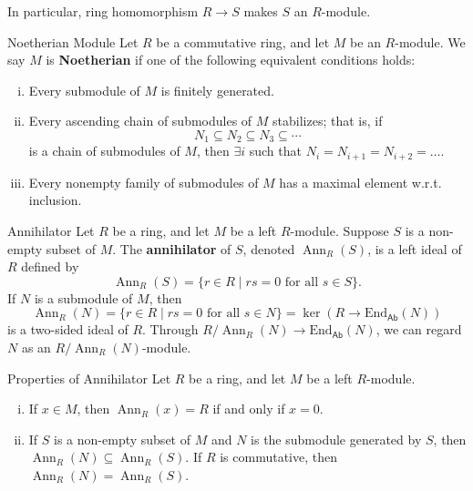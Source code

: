 In particular, ring homomorphism $R\to S$ makes $S$ an $R$-module.

\begin{definition}{Noetherian Module}{}
Let $R$ be a commutative ring, and let $M$ be an $R$-module. We say $M$ is \textbf{Noetherian} if one of the following equivalent conditions holds:
\begin{enumerate}[(i)]
    \item Every submodule of $M$ is finitely generated.
    \item Every ascending chain of submodules of $M$ stabilizes; that is, if
    $$
    N_1 \subseteq N_2 \subseteq N_3 \subseteq \cdots
    $$
    is a chain of submodules of $M$, then $\exists i$ such that $N_i=N_{i+1}=N_{i+2}=\ldots$.
    \item Every nonempty family of submodules of $M$ has a maximal element w.r.t. inclusion.
\end{enumerate}
\end{definition}


\begin{definition}{Annihilator}{}
    Let $R$ be a ring, and let $M$ be a left $R$-module. Suppose $S$ is a non-empty subset of $M$. The \textbf{annihilator} of $S$, denoted $\operatorname{Ann}_R(S)$, is a left ideal of $R$ defined by 
    $$
    \operatorname{Ann}_R(S)=\{r \in R \mid r s=0 \text { for all } s \in S\}.
    $$
    If $N$ is a submodule of $M$, then 
    \[
        \operatorname{Ann}_R(N)=\{r \in R \mid r s=0 \text { for all } s \in N\}=\ker \left(R\longrightarrow\mathrm{End}_{\mathsf{Ab}}\left(N\right)\right)  
    \]
    is a two-sided ideal of $R$. Through $R/\operatorname{Ann}_R(N)\to \mathrm{End}_{\mathsf{Ab}}\left(N\right)$, we can regard $N$ as an $R/\operatorname{Ann}_R(N)$-module.
\end{definition}

\begin{proposition}{Properties of Annihilator}{}
    Let $R$ be a ring, and let $M$ be a left $R$-module. 
    \begin{enumerate}[(i)]
        \item If $x\in M$, then $\operatorname{Ann}_R(x)=R$ if and only if $x=0$.
        \item If $S$ is a non-empty subset of $M$ and $N$ is the submodule generated by $S$, then $\operatorname{Ann}_R(N)\subseteq \operatorname{Ann}_R(S)$. If $R$ is commutative, then $\operatorname{Ann}_R(N)= \operatorname{Ann}_R(S)$.
    \end{enumerate}
\end{proposition}

